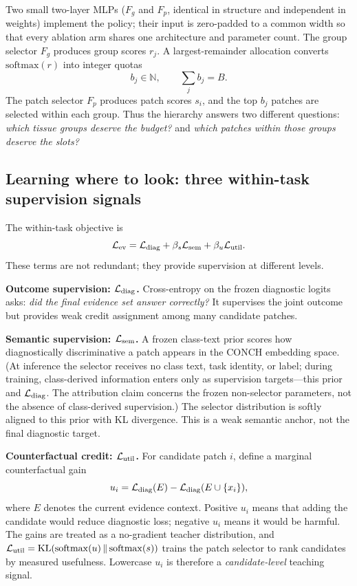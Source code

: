 \documentclass{article}
\def\L{{\cal L}}
\newcommand{\Fg}{F_g}
\newcommand{\Fp}{F_p}
\begin{document}
Two small two-layer MLPs ($\Fg$ and $\Fp$, identical in structure and independent in weights) implement the policy; their input is zero-padded to a common width so that every ablation arm shares one architecture and parameter count.
The group selector $\Fg$ produces group scores $r_j$.
A largest-remainder allocation converts $\mathrm{softmax}(r)$ into integer quotas
\[
b_j\in\mathbb{N}, \qquad \sum_j b_j=B.
\]
The patch selector $\Fp$ produces patch scores $s_i$, and the top $b_j$ patches are selected within each group.
Thus the hierarchy answers two different questions:
\emph{which tissue groups deserve the budget?} and \emph{which patches within those groups deserve the slots?}

\subsection{Learning where to look: three within-task supervision signals}
\label{ssec:within}

The within-task objective is
\begin{equation}
\L_{\mathrm{ev}}
=
\L_{\mathrm{diag}}
+\beta_s\L_{\mathrm{sem}}
+\beta_u\L_{\mathrm{util}}.
\end{equation}
These terms are not redundant; they provide supervision at different levels.

\textbf{Outcome supervision: $\L_{\mathrm{diag}}$.}
Cross-entropy on the frozen diagnostic logits asks:
\emph{did the final evidence set answer correctly?}
It supervises the joint outcome but provides weak credit assignment among many candidate patches.

\textbf{Semantic supervision: $\L_{\mathrm{sem}}$.}
A frozen class-text prior scores how diagnostically discriminative a patch appears in the CONCH embedding space. (At inference the selector receives no class text, task identity, or label; during training, class-derived information enters only as supervision targets---this prior and $\L_{\rm diag}$. The attribution claim concerns the frozen non-selector parameters, not the absence of class-derived supervision.)
The selector distribution is softly aligned to this prior with KL divergence.
This is a weak semantic anchor, not the final diagnostic target.

\textbf{Counterfactual credit: $\L_{\mathrm{util}}$.}
For candidate patch $i$, define a marginal counterfactual gain
\begin{equation}
u_i
=
\L_{\mathrm{diag}}(E)
-
\L_{\mathrm{diag}}(E\cup\{x_i\}),
\label{eq:ui}
\end{equation}
where $E$ denotes the current evidence context.
Positive $u_i$ means that adding the candidate would reduce diagnostic loss; negative $u_i$ means it would be harmful.
The gains are treated as a no-gradient teacher distribution, and $\L_{\mathrm{util}}=\mathrm{KL}(\mathrm{softmax}(u)\,\Vert\,\mathrm{softmax}(s))$ trains the patch selector to rank candidates by measured usefulness.
Lowercase $u_i$ is therefore a \emph{candidate-level} teaching signal.
\end{document}
